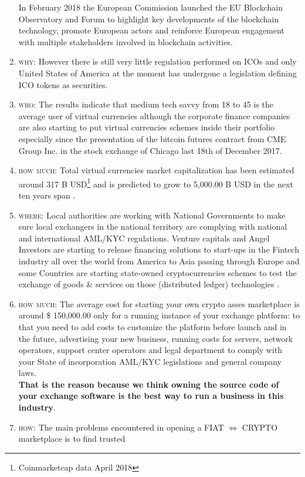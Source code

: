 \documentclass[11pt,fleqn,oneside]{book} %
\begin{document}
\begin{enumerate}
	In February 2018 the European Commission launched the EU Blockchain Observatory and Forum \cite{EUBOaF} to highlight key developments 
	of the blockchain technology, promote European actors and reinforce European engagement with multiple stakeholders involved in blockchain activities.
	\item \textsc{why}: However there is still very little regulation performed on ICOs and only United States of America at the moment has undergone
	a legislation defining ICO tokens as securities. \cite{SECICO}
	\item \textsc{who}: The results indicate that medium tech savvy from 18 to 45 is the average user of
	virtual currencies although the corporate finance companies are also starting to put 
	virtual currencies schemes inside their portfolio especially since the presentation 
	of the bitcoin futures contract from CME Group Inc. in the stock exchange of Chicago
	last 18th of December 2017.
	\item \textsc{how much}: Total virtual currencies market capitalization has been estimated around 317 B USD\footnote{Coinmarketcap data April 2018}
	and is predicted to grow to 5,000.00 B USD in the next ten years span \cite{cryptoMCTenYears}.
	\item \textsc{where}: Local authorities are working with National Governments to make sure local exchangers
	in the national territory are complying with national and international AML/KYC regulations.
	Venture capitals and Angel Investors are starting to release financing solutions to start-ups 
	in the Fintech industry all over the world from America to Asia passing through Europe and some 
	Countries are starting state-owned cryptocurrencies schemes to test the exchange of goods \& services
	on those (distributed ledger) technologies \cite{petro}.
	\item \textsc{how much}: The average cost for starting your own crypto asses marketplace is around \$ 150,000.00 only for a running instance of your exchange platform:
	to that you need to add costs to customize the platform before launch and in the future, advertising your new business, running costs for servers,
	network operators, support center operators and legal department to comply with your State of incorporation AML/KYC legislations and general company laws.\\
	\textbf{That is the reason because we think owning the source code of your exchange software is the best way to run a business in this industry}.
	\item \textsc{how}: The main problems encountered in opening a FIAT $\Leftrightarrow$ CRYPTO marketplace is to find trusted

\end{enumerate}
\end{document}
